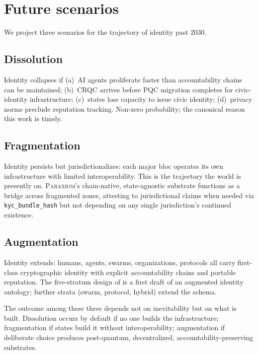 \documentclass[11pt,a4paper,parskip=half-,DIV=12,headings=standardclasses]{scrartcl}
\theoremstyle{ncthm}
\theoremstyle{ncdef}
\newcommand{\paraxiom}{\textsc{Paraxiom}}
\begin{document}
\section{Future scenarios}\label{sec:future}

We project three scenarios for the trajectory of identity past 2030.

\subsection{Dissolution}

Identity collapses if (a)~AI agents proliferate faster than
accountability chains can be maintained; (b)~CRQC arrives before
PQC migration completes for civic-identity infrastructure;
(c)~states lose capacity to issue civic identity; (d)~privacy norms
preclude reputation tracking. Non-zero probability; the canonical
reason this work is timely.

\subsection{Fragmentation}

Identity persists but jurisdictionalizes: each major bloc operates
its own infrastructure with limited interoperability. This is the
trajectory the world is presently on. \paraxiom's chain-native,
state-agnostic substrate functions as a bridge across fragmented
zones, attesting to jurisdictional claims when needed via
\texttt{kyc\_bundle\_hash} but not depending on any single
jurisdiction's continued existence.

\subsection{Augmentation}

Identity extends: humans, agents, swarms, organizations, protocols
all carry first-class cryptographic identity with explicit
accountability chains and portable reputation. The five-stratum design
of  is a first draft of an augmented identity
ontology; further strata (swarm, protocol, hybrid) extend the schema.

The outcome among these three depends not on inevitability but on
what is built. Dissolution occurs by default if no one builds the
infrastructure; fragmentation if states build it without
interoperability; augmentation if deliberate choice produces
post-quantum, decentralized, accountability-preserving substrates.
\end{document}

